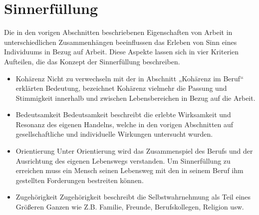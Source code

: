 \section{Sinnerfüllung}
Die in den vorigen Abschnitten beschriebenen Eigenschaften von Arbeit in unterschiedlichen Zusammenhängen beeinflussen das Erleben von Sinn eines Individuums in Bezug auf Arbeit. Diese Aspekte lassen sich in vier Kriterien Aufteilen, die das Konzept der Sinnerfüllung beschreiben. 
\begin{itemize}
    \item Kohärenz\newline
    Nicht zu verwechseln mit der in Abschnitt „Kohärenz im Beruf“ erklärten Bedeutung, bezeichnet Kohärenz vielmehr die Passung und Stimmigkeit innerhalb und zwischen Lebensbereichen in Bezug auf die Arbeit.
    \item Bedeutsamkeit\newline
    Bedeutsamkeit beschreibt die erlebte Wirksamkeit und Resonanz des eigenen Handelns, welche in den vorigen Abschnitten auf gesellschaftliche und individuelle Wirkungen untersucht wurden.
    \item Orientierung\newline
    Unter Orientierung wird das Zusammenspiel des Berufs und der Ausrichtung des eigenen Lebenswegs verstanden. Um Sinnerfüllung zu erreichen muss ein Mensch seinen Lebensweg mit den in seinem Beruf ihm gestellten Forderungen bestreiten können.
    \item Zugehörigkeit\newline
    Zugehörigkeit beschreibt die Selbstwahrnehmung als Teil eines Größeren Ganzen wie Z.B. Familie, Freunde, Berufskollegen, Religion usw.
\end{itemize}
\cite[S.12]{Schnell.2018}

